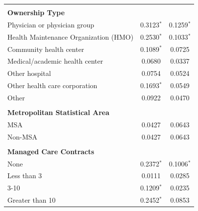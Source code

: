 \documentclass[12pt]{report}
\begin{document}
{\begin{center}
\begin{longtable}{lcc}
                                       &                          &                           \\
\textbf{Ownership Type}                &                          &                           \\
Physician or physician group           & 0.3123$^{*}$               & 0.1259$^{*}$                \\
Health Maintenance Organization (HMO)  & 0.2530$^{*}$               & 0.1033$^{*}$                \\
Community health center                & 0.1089$^{*}$               & 0.0725                    \\
Medical/academic health center         & 0.0680                   & 0.0337                    \\
Other hospital                         & 0.0754                   & 0.0524                    \\
Other health care corporation          & 0.1693$^{*}$               & 0.0549                    \\
Other                                  & 0.0922                   & 0.0470                    \\
                                       &                          &                           \\
\textbf{Metropolitan Statistical Area} &                          &                           \\
MSA                                    & 0.0427                   & 0.0643                    \\
Non-MSA                                & 0.0427                   & 0.0643                    \\
                                       &                          &                           \\
\textbf{Managed Care Contracts}        &                          &                           \\
None                                   & 0.2372$^{*}$               & 0.1006$^{*}$                \\
Less than 3                            & 0.0111                   & 0.0285                    \\
3-10                                   & 0.1209$^{*}$               & 0.0235                    \\
Greater than 10                        & 0.2452$^{*}$               & 0.0853                    \\

\end{longtable}
\end{center}}
\end{document}
